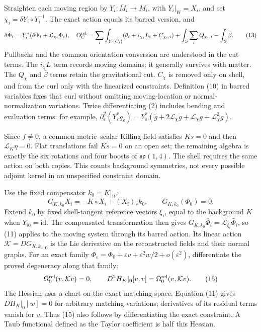 \documentclass[
  10pt,
]{article}
\begin{document}
Straighten each moving region by \(Y_i:\bar M_i\to M_i\), with
\(Y_i|_W=X_i\), and set \(\chi_i=\delta Y_i\circ Y_i^{-1}\). The exact
action equals its barred version, and \[
 \delta\bar\Phi_i=Y_i^*(\delta\Phi_i+\mathcal L_{\chi_i}\Phi_i),
 \quad
 \Theta_C^{\rm rel}
 =\sum_i\int_{Y_i(\bar C_i)}(\theta_i+i_{\chi_i}L_i+C_{\chi_i,i})
   +\int_S\sum_iQ_{\chi_i,i}-\int_{\bar S}\bar\beta .     \tag{13}
\] Pullbacks and the common orientation conversion are understood in the
cut terms. The \(i_\chi L\) term records moving domains; it generally
survives with matter. The \(Q_\chi\) and \(\bar\beta\) terms retain the
gravitational cut. \(C_\chi\) is removed only on shell, and from the
curl only with the linearized constraints. Definition (10) in barred
variables fixes that curl without omitting moving-location or
normal-normalization variations. Twice differentiating (2) includes
bending and evaluation terms: for example,
\(\partial_\varepsilon^2(Y_\varepsilon^*g_\varepsilon)
=Y_\varepsilon^*(\ddot g+2\mathcal L_\chi\dot g+
\mathcal L_{\dot\chi}g+\mathcal L_\chi^2g)\).

Since \(f\ne0\), a common metric--scalar Killing field satisfies
\(Ks=0\) and then \(\mathcal L_K\eta=0\). Flat translations fail
\(Ks=0\) on an open set; the remaining algebra is exactly the six
rotations and four boosts of \(\mathfrak{so}(1,4)\). The shell requires
the same action on both copies. This counts background symmetries, not
every possible adjoint kernel in an unspecified constraint domain.

Use the fixed compensator \(k_0=K|_W\): \[
 G_{K,k_0}X_i=-K\circ X_i+(X_i)_*k_0,
 \qquad G_{K,k_0}(\Phi_0)=0 .                            \tag{14}
\] Extend \(k_0\) by fixed shell-tangent reference vectors \(\xi_i\),
equal to the background \(K\) when \(Y_{i0}=\mathrm{id}\). The
compensated transformation then gives
\(G_{K,k_0}\bar\Phi_i=\mathcal L_{\xi_i}\bar\Phi_i\), so (11) applies to
the moving system through its barred action. Its linear action
\(\mathcal K=DG_{K,k_0}|_0\) is the Lie derivative on the reconstructed
fields and their normal graphs. For an exact family
\(\Phi_\varepsilon=\Phi_0+\varepsilon v+\varepsilon^2w/2+o(\varepsilon^2)\),
differentiate the proved degeneracy along that family: \[
 \Omega^{\rm rel}_0(v,\mathcal K v)=0,
 \qquad D^2H_K|_0[v,v]=\Omega^{\rm rel}_0(v,\mathcal K v). \tag{15}
\] The Hessian uses a chart on the exact matching space. Equation (11)
gives \(DH_K|_0[w]=0\) for arbitrary matching variations; derivatives of
its residual terms vanish for \(v\). Thus (15) also follows by
differentiating the exact constraint. A Taub functional defined as the
Taylor coefficient is half this Hessian.
\end{document}
